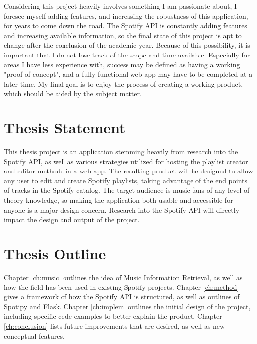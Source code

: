 Considering this project heavily involves something I am passionate about, I foresee
myself adding features, and increasing the robustness of this application, for years
to come down the road. The Spotify API is constantly adding features and increasing
available information, so the final state of this project is apt to change after
the conclusion of the academic year. Because of this possibility, it is important
that I do not lose track of the scope and time available. Especially for areas I
have less experience with, success may be defined as having a working "proof of
concept", and a fully functional web-app may have to be completed at a later time.
My final goal is to enjoy the process of creating a working product, which should
be aided by the subject matter.

\section{Thesis Statement}\label{sec:statement}

This thesis project is an application stemming heavily from research into the
Spotify API, as well as various strategies utilized for hosting the playlist
creator and editor methods in a web-app. The resulting product will be designed
to allow any user to edit and create Spotify playlists, taking advantage of the
end points of tracks in the Spotify catalog. The target audience is music fans
of any level of theory knowledge, so making the application both usable and accessible
for anyone is a major design concern. Research into the Spotify API will directly
impact the design and output of the project.

\section{Thesis Outline}\label{sec:outline}

Chapter \ref{ch:music} outlines the idea of Music Information Retrieval, as well as how the
field has been used in existing Spotify projects. Chapter \ref{ch:method} gives a framework of
how the Spotify API is structured, as well as outlines of Spotipy and Flask. Chapter
\ref{ch:implem} outlines the initial design of the project, including specific code
examples to better explain the product. Chapter \ref{ch:conclusion} lists future
improvements that are desired, as well as new conceptual features.
